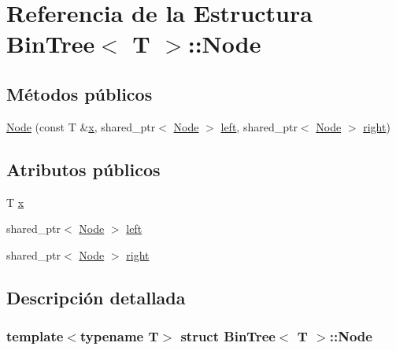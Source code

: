 \hypertarget{struct_bin_tree_1_1_node}{}\section{Referencia de la Estructura Bin\+Tree$<$ T $>$\+:\+:Node}
\label{struct_bin_tree_1_1_node}
\subsection*{Métodos públicos}
\begin{DoxyCompactItemize}
\item 
\hyperlink{struct_bin_tree_1_1_node_af45885e303875c018e89fa5c8b96bde0}{Node} (const T \&\hyperlink{struct_bin_tree_1_1_node_a9c268d4af01559e8237dbeb5bd19af91}{x}, shared\+\_\+ptr$<$ \hyperlink{struct_bin_tree_1_1_node}{Node} $>$ \hyperlink{struct_bin_tree_1_1_node_a265a6367635a38838e6a6366564be78d}{left}, shared\+\_\+ptr$<$ \hyperlink{struct_bin_tree_1_1_node}{Node} $>$ \hyperlink{struct_bin_tree_1_1_node_a6df770137090da60cd0376ce06893cbd}{right})
\end{DoxyCompactItemize}
\subsection*{Atributos públicos}
\begin{DoxyCompactItemize}
\item 
T \hyperlink{struct_bin_tree_1_1_node_a9c268d4af01559e8237dbeb5bd19af91}{x}
\item 
shared\+\_\+ptr$<$ \hyperlink{struct_bin_tree_1_1_node}{Node} $>$ \hyperlink{struct_bin_tree_1_1_node_a265a6367635a38838e6a6366564be78d}{left}
\item 
shared\+\_\+ptr$<$ \hyperlink{struct_bin_tree_1_1_node}{Node} $>$ \hyperlink{struct_bin_tree_1_1_node_a6df770137090da60cd0376ce06893cbd}{right}
\end{DoxyCompactItemize}


\subsection{Descripción detallada}
\subsubsection*{template$<$typename T$>$\newline
struct Bin\+Tree$<$ T $>$\+::\+Node}



